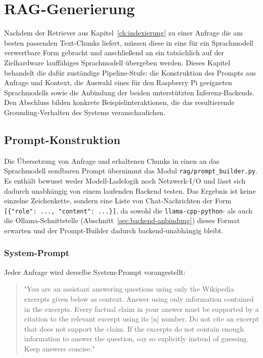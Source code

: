 \chapter{RAG-Generierung}
\label{ch:rag}

Nachdem der Retriever aus Kapitel~\ref{ch:indexierung} zu einer Anfrage die am besten
passenden Text-Chunks liefert, müssen diese in eine für ein Sprachmodell verwertbare
Form gebracht und anschließend an ein tatsächlich auf der Zielhardware lauffähiges
Sprachmodell übergeben werden. Dieses Kapitel behandelt die dafür zuständige
Pipeline-Stufe: die Konstruktion des Prompts aus Anfrage und Kontext, die Auswahl
eines für den Raspberry Pi geeigneten Sprachmodells sowie die Anbindung der beiden
unterstützten Inferenz-Backends. Den Abschluss bilden konkrete Beispielinteraktionen,
die das resultierende Grounding-Verhalten des Systems veranschaulichen.

\section{Prompt-Konstruktion}
\label{sec:prompt-konstruktion}

Die Übersetzung von Anfrage und erhaltenen Chunks in einen an das Sprachmodell
sendbaren Prompt übernimmt das Modul \texttt{rag/\allowbreak{}prompt\_\allowbreak{}builder.\allowbreak{}py}. Es enthält
bewusst weder Modell-Ladelogik noch Netzwerk-I/O und lässt sich dadurch unabhängig
von einem laufenden Backend testen. Das Ergebnis ist keine einzelne Zeichenkette,
sondern eine Liste von Chat-Nachrichten der Form
\texttt{[\{"role": ..., "content": ...\}]}, da sowohl die \texttt{llama-cpp-python}-
als auch die Ollama-Schnittstelle (Abschnitt~\ref{sec:backend-anbindung}) dieses
Format erwarten und der Prompt-Builder dadurch backend-unabhängig bleibt.

\subsection{System-Prompt}

Jeder Anfrage wird derselbe System-Prompt vorangestellt:

\begin{quote}
\ttfamily\small\raggedright
"You are an assistant answering questions using only the Wikipedia excerpts given
below as context. Answer using only information contained in the excerpts. Every
factual claim in your answer must be supported by a citation to the relevant excerpt
using its [n] number. Do not cite an excerpt that does not support the claim. If the
excerpts do not contain enough information to answer the question, say so explicitly
instead of guessing. Keep answers concise."
\end{quote}

